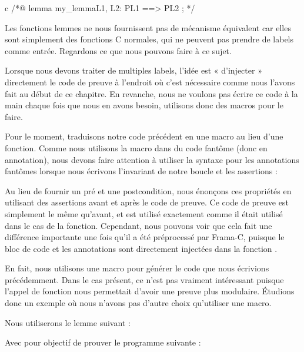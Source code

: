 \begin{CodeBlock}{c}
/*@
  lemma my_lemma{L1, L2}:  P{L1} ==> P{L2} ;
*/
\end{CodeBlock}


Les fonctions lemmes ne nous fournissent pas de mécanisme équivalent
car elles sont simplement des fonctions C normales, qui ne peuvent pas prendre
de labels comme entrée. Regardons ce que nous pouvons faire à ce sujet.





Lorsque nous devons traiter de multiples labels, l'idée est « d'injecter »
directement le code de preuve à l'endroit où c'est nécessaire comme nous 
l'avons fait au début de ce chapitre. En revanche, nous ne voulons pas écrire
ce code à la main chaque fois que nous en avons besoin, utilisons donc des
macros pour le faire.


Pour le moment, traduisons notre code précédent en une macro au lieu d'une
fonction. Comme nous utilisons la macro dans du code fantôme (donc en annotation),
nous devons faire attention à utiliser la syntaxe pour les annotations fantômes
lorsque nous écrivons l'invariant de notre boucle et les assertions :




Au lieu de fournir un pré et une postcondition, nous énonçons ces propriétés en
utilisant des assertions avant et après le code de preuve. Ce code de preuve est
simplement le même qu'avant, et est utilisé exactement comme il était utilisé dans
le cas de la fonction. Cependant, nous pouvons voir que cela fait une différence
importante une fois qu'il a été préprocessé par Frama-C, puisque le bloc de code
et les annotations sont directement injectées dans la fonction 
.




En fait, nous utilisons une macro pour générer le code que nous écrivions
précédemment. Dans le cas présent, ce n'est pas vraiment intéressant puisque
l'appel de fonction nous permettait d'avoir une preuve plus modulaire. Étudions
donc un exemple où nous n'avons pas d'autre choix qu'utiliser une macro.


Nous utiliserons le lemme suivant :




Avec pour objectif de prouver le programme suivante :


